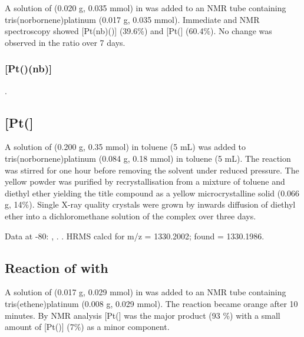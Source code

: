 A solution of \Phthixantphos{} (0.020 g, 0.035 mmol) in  was added to an NMR tube containing tris(norbornene)platinum (0.017 g, 0.035 mmol).  Immediate \proton{} and \phosphorus{} NMR spectroscopy showed [Pt(nb)(\Phthixantphos)] (39.6\%) and [Pt(\Phthixantphos{}] (60.4\%).  No change was observed in the ratio over 7 days.   

\subsubsection{[Pt(\Phthixantphos)(nb)]}

.

\subsection*{\texorpdfstring{[Pt(\Phthixantphos{}]} P}

A solution of \Phthixantphos{} (0.200 g, 0.35 mmol) in toluene (5 mL) was added to tris(norbornene)platinum (0.084 g, 0.18 mmol) in toluene (5 mL).  The reaction was stirred for one hour before removing the solvent under reduced pressure.  The yellow powder was purified by recrystallisation from a mixture of toluene and diethyl ether yielding the title compound as a yellow microcrystalline solid (0.066 g, 14\%).  Single X-ray quality crystals were grown by inwards diffusion of diethyl ether into a dichloromethane solution of the complex over three days.  


Data at -80\degC:
,
.
.
HRMS calcd for  \ce{[M]+} m/z = 1330.2002; found = 1330.1986.

\subsection*{Reaction of \Phthixantphos{} with \texorpdfstring{\ce{[Pt(C2H4)3]}} P}

A solution of \Phthixantphos{} (0.017 g, 0.029 mmol) in  was added to an NMR tube containing tris(ethene)platinum (0.008 g, 0.029 mmol).  The reaction became orange after 10 minutes.  By \phosphorus{} NMR analysis [Pt(\Phthixantphos{}] was the major product (93 \%) with a small amount of [Pt(\Phthixantphos)] (7\%) as a minor component.  

